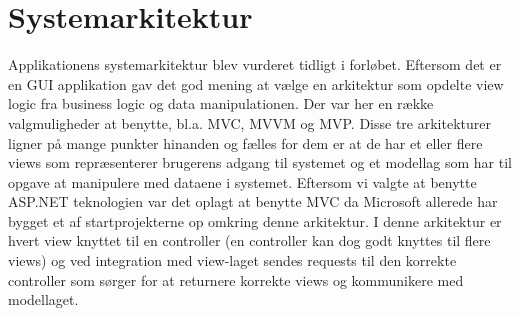 \section{Systemarkitektur}

Applikationens systemarkitektur blev vurderet tidligt i forløbet. Eftersom det er en GUI applikation gav det god mening at vælge en arkitektur som opdelte view logic fra business logic og data manipulationen. Der var her en række valgmuligheder at benytte, bl.a. MVC, MVVM og MVP. Disse tre arkitekturer ligner på mange punkter hinanden og fælles for dem er at de har et eller flere views som repræsenterer brugerens adgang til systemet og et modellag som har til opgave at manipulere med dataene i systemet. Eftersom vi valgte at benytte ASP.NET teknologien \citep{aspnetmvcWeb} var det oplagt at benytte MVC da Microsoft allerede har  bygget et af startprojekterne op omkring denne arkitektur. I denne arkitektur er hvert view knyttet til en controller (en controller kan dog godt knyttes til flere views) og ved integration med view-laget sendes requests til den korrekte controller som sørger for at returnere korrekte views og kommunikere med modellaget.